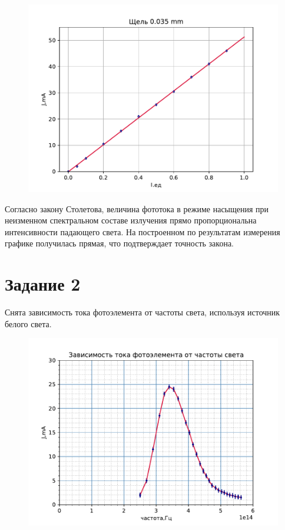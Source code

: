 \begin{center}
    \begin{figure}[H]
            \centering
            \includegraphics[width=0.5\linewidth]{scripts/z10035mm} 
            \vspace{-10pt}
            \label{fig:11}
    \end{figure}
\end{center}

Согласно закону Столетова, величина фототока в режиме насыщения при неизменном спектральном составе излучения прямо пропорциональна интенсивности падающего света. На построенном по результатам измерения графике получилась прямая, что подтверждает точность закона.

\section{Задание 2}
Снята зависимость тока фотоэлемента от частоты света, используя источник белого света.
\begin{figure}[H]
	\centering
	\includegraphics[scale=1]{scripts/z2.pdf}
	\caption{}
	\label{fig:12}
\end{figure}

